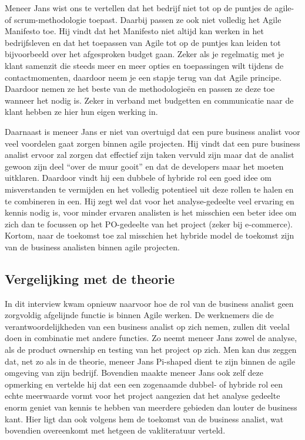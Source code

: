 \documentclass{hogent-article}
\begin{document}
Meneer Jans wist ons te vertellen dat het bedrijf niet tot op de puntjes de agile- of scrum-methodologie toepast. Daarbij passen ze ook niet volledig het Agile Manifesto toe. Hij vindt dat het Manifesto niet altijd kan werken in het bedrijfsleven en dat het toepassen van Agile tot op de puntjes kan leiden tot bijvoorbeeld over het afgesproken budget gaan. Zeker als je regelmatig met je klant samenzit die steeds meer en meer opties en toepassingen wilt tijdens de contactmomenten, daardoor neem je een stapje terug van dat Agile principe. Daardoor nemen ze het beste van de methodologieën en passen ze deze toe wanneer het nodig is. Zeker in verband met budgetten en communicatie naar de klant hebben ze hier hun eigen werking in.

Daarnaast is meneer Jans er niet van overtuigd dat een pure business analist voor veel voordelen gaat zorgen binnen agile projecten. Hij vindt dat een pure business analist ervoor zal zorgen dat effectief zijn taken vervuld zijn maar dat de analist gewoon zijn deel “over de muur gooit” en dat de developers maar het moeten uitklaren. Daardoor vindt hij een dubbele of hybride rol een goed idee om misverstanden te vermijden en het volledig potentieel uit deze rollen te halen en te combineren in een. Hij zegt wel dat voor het analyse-gedeelte veel ervaring en kennis nodig is, voor minder ervaren analisten is het misschien een beter idee om zich dan te focussen op het PO-gedeelte van het project (zeker bij e-commerce). Kortom, naar de toekomst toe zal misschien het hybride model de toekomst zijn van de business analisten binnen agile projecten.


\subsection{Vergelijking met de theorie}

In dit interview kwam opnieuw naarvoor hoe de rol van de business analist geen zorgvoldig afgelijnde functie is binnen Agile werken. De werknemers die de verantwoordelijkheden van een business analist op zich nemen, zullen dit veelal doen in combinatie met andere functies. Zo neemt meneer Jans zowel de analyse, als de product ownership en testing van het project op zich.  Men kan dus zeggen dat, net zo als in de theorie, meneer Jans Pi-shaped dient te zijn binnen de agile omgeving van zijn bedrijf. Bovendien maakte meneer Jans ook zelf deze opmerking en vertelde hij dat een een zogenaamde dubbel- of hybride rol een echte meerwaarde vormt voor het project aangezien dat het analyse gedeelte enorm geniet van kennis te hebben van meerdere gebieden dan louter de business kant. Hier ligt dan ook volgens hem de toekomst van de business analist, wat bovendien overeenkomt met hetgeen de vakliteratuur verteld. 
\end{document}
